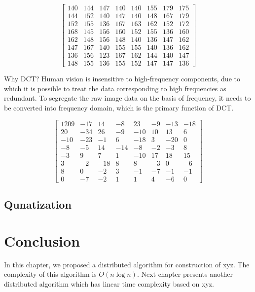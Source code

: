 \begin{equation}
    \begin{bmatrix}
        140 & 144 & 147 & 140 & 140 & 155 & 179 & 175\\ 
        144 & 152 & 140 & 147 & 140 & 148 & 167 & 179\\ 
        152 & 155 & 136 & 167 & 163 & 162 & 152 & 172\\ 
        168 & 145 & 156 & 160 & 152 & 155 & 136 & 160\\ 
        162 & 148 & 156 & 148 & 140 & 136 & 147 & 162\\ 
        147 & 167 & 140 & 155 & 155 & 140 & 136 & 162\\ 
        136 & 156 & 123 & 167 & 162 & 144 & 140 & 147\\ 
        148 & 155 & 136 & 155 & 152 & 147 & 147 & 136
    \end{bmatrix}
    \label{eq:8x8block}   
\end{equation}

Why DCT? Human vision is insensitive to high-frequency components, due to which it is possible to treat the data corresponding to high frequencies as redundant. To segregate the raw image data on the basis of frequency, it needs to be converted into frequency domain, which is the primary function of DCT.

\begin{equation}
    \begin{bmatrix}
        1209 & -17 & 14 & -8 & 23 & -9 & -13 & -18 \\
        20 & -34 & 26 & -9 & -10 & 10 & 13 & 6 \\
        -10 & -23 & -1 & 6 & -18 & 3 & -20 & 0 \\
        -8 & -5 & 14 & -14 & -8 & -2 & -3 & 8 \\
        -3 & 9 & 7 & 1 & -10 & 17 & 18 & 15 \\
        3 & -2 & -18 & 8 & 8 & -3 & 0 & -6 \\
        8 & 0 & -2 & 3 & -1 & -7 & -1 & -1 \\
        0 & -7 & -2 & 1 & 1 & 4 & -6 & 0
    \end{bmatrix}
    \label{eq:DCTTransform}
\end{equation}

\subsection{Qunatization}

\section{Conclusion}
In this chapter, we proposed a distributed algorithm
for construction of xyz.
The complexity of this algorithm is $O(n \log n)$.
Next chapter presents
another distributed algorithm which has linear time 
complexity based on xyz.

